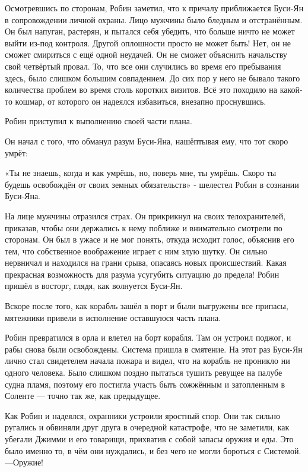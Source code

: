 \documentclass[a5paper, 9pt,
final, openany, twoside=true]{memoir}
\begin{document}
Осмотревшись по сторонам, Робин заметил, что к причалу приближается Буси-Ян в сопровождении личной охраны. Лицо мужчины было бледным и отстранённым. Он был напуган, растерян, и пытался себя убедить, что больше ничто не может выйти из-под контроля. Другой оплошности просто не может быть! Нет, он не сможет смириться с ещё одной неудачей. Он не сможет объяснить начальству свой четвёртый провал. То, что все они случились во время его пребывания здесь, было слишком большим совпадением. До сих пор у него не бывало такого количества проблем во время столь коротких визитов. Всё это походило на какой-то кошмар, от которого он надеялся избавиться, внезапно проснувшись.\bigskip

Робин приступил к выполнению своей части плана.

Он начал с того, что обманул разум Буси-Яна, нашёптывая ему, что тот скоро умрёт:

«Ты не знаешь, когда и как умрёшь, но, поверь мне, ты умрёшь. Скоро ты будешь освобождён от своих земных обязательств» - шелестел Робин в сознании Буси-Яна.

На лице мужчины отразился страх. Он прикрикнул на своих телохранителей, приказав, чтобы они держались к нему поближе и внимательно смотрели по сторонам. Он был в ужасе и не мог понять, откуда исходит голос, объяснив его тем, что собственное воображение играет с ним злую шутку. Он сильно нервничал и находился на грани срыва, опасаясь новых происшествий. Какая прекрасная возможность для разума усугубить ситуацию до предела! Робин пришёл в восторг, глядя, как волнуется Буси-Ян.

Вскоре после того, как корабль зашёл в порт и были выгружены все припасы, мятежники привели в исполнение оставшуюся часть плана.\bigskip

Робин превратился в орла и влетел на борт корабля. Там он устроил поджог, и рабы снова были освобождены. Система пришла в смятение. На этот раз Буси-Ян лично стал свидетелем начала пожара и видел, что на корабль не проникло ни одного человека. Было слишком поздно пытаться тушить ревущее на палубе судна пламя, поэтому его постигла участь быть сожжённым и затопленным в Соленте — точно так же, как предыдущее.

Как Робин и надеялся, охранники устроили яростный спор. Они так сильно ругались и обвиняли друг друга в очередной катастрофе, что не заметили, как убегали Джимми и его товарищи, прихватив с собой запасы оружия и еды. Это было именно то, в чём они нуждались, и без чего не могли бороться с Системой. —Оружие!
\end{document}
